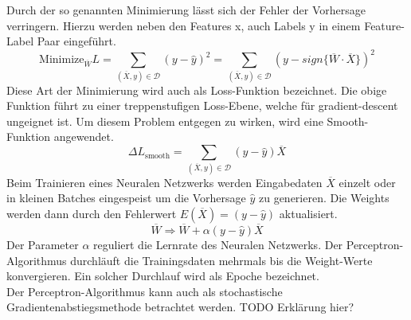 \noindent 
Durch der so genannten Minimierung lässt sich der Fehler der Vorhersage verringern. Hierzu werden neben den Features x, auch Labels y in einem Feature-Label Paar eingeführt. 
$$\text{Minimize}_{\overline{W}}L = \sum\limits_{(\overline{X},y)\in \mathcal{D}}(y - \hat{y})^2 = \sum\limits_{(\overline{X},y)\in \mathcal{D}}(y - sign\{\overline{W} \cdot \overline{X}\})^2$$
Diese Art der Minimierung wird auch als Loss-Funktion bezeichnet. Die obige Funktion führt zu einer treppenstufigen Loss-Ebene, welche für gradient-descent ungeignet ist. Um diesem Problem entgegen zu wirken, wird eine Smooth-Funktion angewendet.
$$\Delta L_{\text{smooth}} = \sum\limits_{(\overline{X},y)\in \mathcal{D}}(y - \hat{y})\overline{X}$$
Beim Trainieren eines Neuralen Netzwerks werden Eingabedaten $\overline{X}$ einzelt oder in kleinen Batches eingespeist um die Vorhersage $\hat{y}$ zu generieren. Die Weights werden dann durch den Fehlerwert $E(\overline{X}) = (y - \hat{y})$ aktualisiert.
$$\overline{W} \Rightarrow \overline{W} + \alpha(y - \hat{y})\overline{X}$$
Der Parameter $\alpha$ reguliert die Lernrate des Neuralen Netzwerks. Der Perceptron-Algorithmus durchläuft die Trainingsdaten mehrmals bis die Weight-Werte konvergieren. Ein solcher Durchlauf wird als Epoche bezeichnet.\\
Der Perceptron-Algorithmus kann auch als stochastische Gradientenabstiegsmethode betrachtet werden. TODO Erklärung hier? 